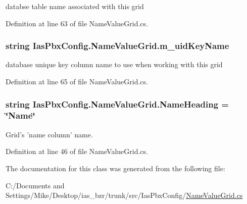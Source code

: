 databse table name associated with this grid 

Definition at line 63 of file NameValueGrid.cs.\hypertarget{class_ias_pbx_config_1_1_name_value_grid_ace4c5d89cfdadc8de017dcbc9898a7fe}{
\subsubsection[{m\_\-uidKeyName}]{\setlength{\rightskip}{0pt plus 5cm}string {\bf IasPbxConfig.NameValueGrid.m\_\-uidKeyName}}}
\label{class_ias_pbx_config_1_1_name_value_grid_ace4c5d89cfdadc8de017dcbc9898a7fe}


database unique key column name to use when working with this grid 

Definition at line 65 of file NameValueGrid.cs.\hypertarget{class_ias_pbx_config_1_1_name_value_grid_add49a07f2a41723711cae88d6a6f7360}{
\subsubsection[{NameHeading}]{\setlength{\rightskip}{0pt plus 5cm}string {\bf IasPbxConfig.NameValueGrid.NameHeading} = \char`\"{}Name\char`\"{}}}
\label{class_ias_pbx_config_1_1_name_value_grid_add49a07f2a41723711cae88d6a6f7360}


Grid's 'name column' name. 

Definition at line 46 of file NameValueGrid.cs.

The documentation for this class was generated from the following file:\begin{DoxyCompactItemize}
\item 
C:/Documents and Settings/Mike/Desktop/ias\_\-bzr/trunk/src/IasPbxConfig/\hyperlink{_name_value_grid_8cs}{NameValueGrid.cs}\end{DoxyCompactItemize}
